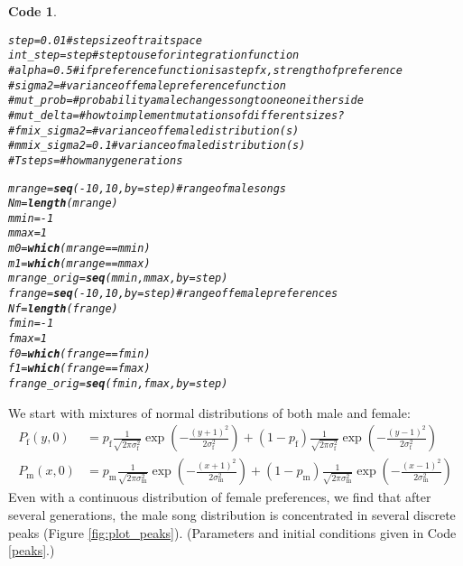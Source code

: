 \documentclass{article}\usepackage[]{graphicx}\usepackage[]{color}
\makeatletter
\newcommand{\hlnum}[1]{\textcolor[rgb]{0.686,0.059,0.569}{#1}}%
\newcommand{\hlcom}[1]{\textcolor[rgb]{0.678,0.584,0.686}{\textit{#1}}}%
\newcommand{\hlopt}[1]{\textcolor[rgb]{0,0,0}{#1}}%
\newcommand{\hlstd}[1]{\textcolor[rgb]{0.345,0.345,0.345}{#1}}%
\newcommand{\hlkwb}[1]{\textcolor[rgb]{0.69,0.353,0.396}{#1}}%
\newcommand{\hlkwc}[1]{\textcolor[rgb]{0.333,0.667,0.333}{#1}}%
\newcommand{\hlkwd}[1]{\textcolor[rgb]{0.737,0.353,0.396}{\textbf{#1}}}%
\newenvironment{kframe}{%
 \def\at@end@of@kframe{}%
 \ifinner\ifhmode%
  \def\at@end@of@kframe{\end{minipage}}%
  \begin{minipage}{\columnwidth}%
 \fi\fi%
 \def\FrameCommand##1{\hskip\@totalleftmargin \hskip-\fboxsep
 \colorbox{shadecolor}{##1}\hskip-\fboxsep
     \hskip-\linewidth \hskip-\@totalleftmargin \hskip\columnwidth}%
 \MakeFramed {\advance\hsize-\width
   \@totalleftmargin\z@ \linewidth\hsize
   \@setminipage}}%
 {\par\unskip\endMakeFramed%
 \at@end@of@kframe}
\newenvironment{knitrout}{}{} %
\newtheorem{rexample}{Code}[section]
\makeatother
\begin{document}
\begin{knitrout}\footnotesize
{}\color{fgcolor}\begin{kframe}
\begin{rexample}\label{parameters}\hfill{}\begin{alltt}
\hlstd{step} \hlkwb{=} \hlnum{0.01} \hlcom{#step size of trait space}
\hlstd{int_step} \hlkwb{=} \hlstd{step} \hlcom{#step to use for integration function}
\hlcom{# alpha = 0.5 #if preference function is a step fx, strength of preference}
\hlcom{# sigma2 = #variance of female preference function}
\hlcom{# mut_prob =  #probability a male changes song to one on either side}
\hlcom{# mut_delta = #how to implement mutations of different sizes?}
\hlcom{# fmix_sigma2 = #variance of female distribution(s)}
\hlcom{# mmix_sigma2 = 0.1 #variance of male distribution(s)}
\hlcom{# Tsteps = #how many generations}

\hlstd{mrange} \hlkwb{=} \hlkwd{seq}\hlstd{(}\hlopt{-}\hlnum{10}\hlstd{,}\hlnum{10}\hlstd{,}\hlkwc{by}\hlstd{=step)} \hlcom{#range of male songs}
\hlstd{Nm} \hlkwb{=} \hlkwd{length}\hlstd{(mrange)}
\hlstd{mmin} \hlkwb{=} \hlopt{-}\hlnum{1}
\hlstd{mmax} \hlkwb{=} \hlnum{1}
\hlstd{m0} \hlkwb{=} \hlkwd{which}\hlstd{(mrange}\hlopt{==}\hlstd{mmin)}
\hlstd{m1} \hlkwb{=} \hlkwd{which}\hlstd{(mrange}\hlopt{==}\hlstd{mmax)}
\hlstd{mrange_orig} \hlkwb{=} \hlkwd{seq}\hlstd{(mmin,mmax,}\hlkwc{by}\hlstd{=step)}
\hlstd{frange} \hlkwb{=} \hlkwd{seq}\hlstd{(}\hlopt{-}\hlnum{10}\hlstd{,}\hlnum{10}\hlstd{,}\hlkwc{by}\hlstd{=step)} \hlcom{#range of female preferences}
\hlstd{Nf} \hlkwb{=} \hlkwd{length}\hlstd{(frange)}
\hlstd{fmin} \hlkwb{=} \hlopt{-}\hlnum{1}
\hlstd{fmax} \hlkwb{=} \hlnum{1}
\hlstd{f0} \hlkwb{=} \hlkwd{which}\hlstd{(frange}\hlopt{==}\hlstd{fmin)}
\hlstd{f1} \hlkwb{=} \hlkwd{which}\hlstd{(frange}\hlopt{==}\hlstd{fmax)}
\hlstd{frange_orig} \hlkwb{=} \hlkwd{seq}\hlstd{(fmin,fmax,}\hlkwc{by}\hlstd{=step)}
\end{alltt}
\end{rexample}\end{kframe}
\end{knitrout}

We start with mixtures of normal distributions of both male and female:
\begin{align*}
P_\text{f}(y,0)&=p_\text{f}\frac{1}{\sqrt{2\pi\sigma_\text{f}^2}}\exp\left(-\frac{(y+1)^2}{2\sigma_\text{f}^2}\right)+(1-p_\text{f})\frac{1}{\sqrt{2\pi\sigma_\text{f}^2}}\exp\left(-\frac{(y-1)^2}{2\sigma_\text{f}^2}\right)
\\P_\text{m}(x,0)&=p_\text{m}\frac{1}{\sqrt{2\pi\sigma_\text{m}^2}}\exp\left(-\frac{(x+1)^2}{2\sigma_\text{m}^2}\right)+(1-p_\text{m})\frac{1}{\sqrt{2\pi\sigma_\text{m}^2}}\exp\left(-\frac{(x-1)^2}{2\sigma_\text{m}^2}\right)
\end{align*}
Even with a continuous distribution of female preferences, we find that after several generations, the male song distribution is concentrated in several discrete peaks (Figure \ref{fig:plot_peaks}). (Parameters and initial conditions given in Code \ref{peaks}.)
\end{document}
